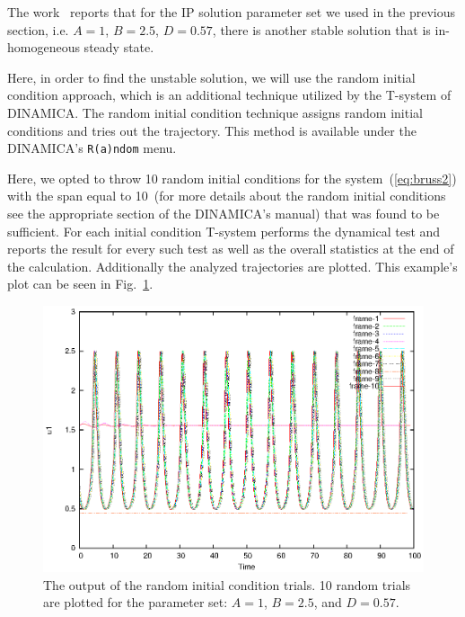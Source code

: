 \documentclass[11pt,a4paper]{article}
\begin{document}
The work~\cite{VolkovBruss2} reports that for the IP solution parameter set we used
in the previous section, i.e. $A=1$, $B=2.5$, $D=0.57$, there is another stable
solution that is in-homogeneous steady state.

Here, in order to find the unstable solution, we will use the random initial
condition approach, which is an additional technique utilized by the T-system of
DINAMICA. The random initial condition technique assigns random initial conditions
and tries out the trajectory. This method is available under the DINAMICA's
\texttt{R(a)ndom} menu.

Here, we opted to throw 10 random initial conditions for the system~(\ref{eq:bruss2})
with the span equal to 10~(for more details about the random initial conditions see
the appropriate section of the DINAMICA's manual) that was found to be
sufficient. For each initial condition T-system performs the dynamical test and
reports the result for every such test as well as the overall statistics at the end
of the calculation. Additionally the analyzed trajectories are plotted. This
example's plot can be seen in Fig.~\ref{fig:bruss2_rnd_trials}.

\begin{figure}[h]
  \centering
  \includegraphics[scale=0.75]{br2_rnd}
  \caption{The output of the random initial condition trials. 10 random trials are
    plotted for the parameter set: $A=1$, $B=2.5$, and $D=0.57$.}
  \label{fig:bruss2_rnd_trials}
\end{figure}
\end{document}
